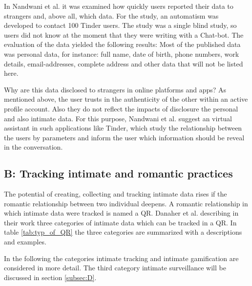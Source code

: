 In Nandwani et al. \cite{10.1007/978-3-319-61542-4_32} it was examined how quickly users reported their data to strangers and, above all, which data. For the study, an automatism was developed to contact 100 Tinder users. The study was a single blind study, so users did not know at the moment that they were writing with a Chat-bot. The evaluation of the data yielded the following results: Most of the published data was personal data, for instance: full name, date of birth, phone numbers, work details, email-addresses, complete address and other data that will not be listed here.

Why are this data disclosed to strangers in online platforms and apps? As mentioned above, the user trusts in the authenticity of the other within an active profile account. Also they do not reflect the impacts of disclosure the personal and also intimate data. For this purpose, Nandwani et al. \cite{10.1007/978-3-319-61542-4_32} suggest an virtual assistant in such applications like Tinder, which study the relationship between the users by parameters and inform the user which information should be reveal in the conversation.

\subsection{B: Tracking intimate and romantic practices}
\label{subsec:B}
The potential of creating, collecting and tracking intimate data rises if the romantic relationship between two individual deepens. A romantic relationship in which intimate data were tracked is named a \ac{QR}.
Danaher et al. \cite{doi:10.1080/15265161.2017.1409823} describing in their work three categories of intimate data which can be tracked in a \acs{QR}. In table \ref{tab:typ_of_QR} the three categories are summarized with a descriptions and examples.

In the following the categories intimate tracking and intimate gamification are considered in more detail.
The third category intimate surveillance will be discussed in section \ref{subsec:D}.

